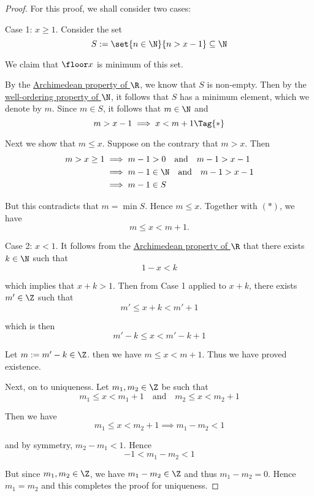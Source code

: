\begin{proof}
  For this proof, we shall consider two cases:

  Case 1: $x\geq 1$. Consider the set
  $$
    S:=\set{n\in\N}{n>x-1}\subseteq\N
  $$

  We claim that $\floor x$ is minimum of this set.

  By the \href{fbc2289}{Archimedean property of $\R$}, we know that $S$ is
  non-empty. Then by the \href{cd7c4d1}{well-ordering property of $\N$}, it
  follows that $S$ has a minimum element, which we denote by $m$. Since $m\in S$,
  it follows that $m\in\N$ and
  \begin{equation*}
    m>x-1\implies x<m+1\Tag{*}
  \end{equation*}

  Next we show that $m\leq x$. Suppose on the contrary that $m>x$. Then
  \begin{align*}
    m>x\geq1
     &\implies m-1>0\quad\text{and}\quad m-1>x-1    \\
     &\implies m-1\in\N\quad\text{and}\quad m-1>x-1 \\
     &\implies m-1\in S
  \end{align*}

  But this contradicts that $m=\min S$. Hence $m\leq x$. Together with $(*)$, we
  have
  $$
    m\leq x<m+1.
  $$

  Case 2: $x<1$. It follows from the \href{fbc2289}{Archimedean property of $\R$}
  that there exists $k\in\N$ such that
  $$
    1-x<k
  $$

  which implies that $x+k>1$. Then from Case 1 applied to $x+k$, there exists
  $m'\in\Z$ such that
  $$
    m'\leq x+k<m'+1
  $$

  which is then
  $$
    m'-k\leq x<m'-k+1
  $$

  Let $m:=m'-k\in\Z$. then we have $m\leq x<m+1$. Thus we have proved existence.

  Next, on to uniqueness. Let $m_1,m_2\in\Z$ be such that
  $$
    m_1\leq x<m_1+1\quad\text{and}\quad m_2\leq x<m_2+1
  $$

  Then we have
  $$
    m_1\leq x<m_2+1 \implies m_1-m_2<1
  $$

  and by symmetry, $m_2-m_1<1$. Hence
  $$
    -1<m_1-m_2<1
  $$

  But since $m_1,m_2\in\Z$, we have $m_1-m_2\in\Z$ and thus $m_1-m_2=0$. Hence
  $m_1=m_2$ and this completes the proof for uniqueness.
\end{proof}

\label{b88beb7}

